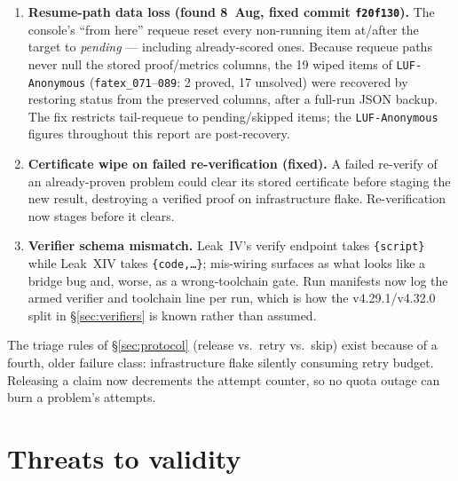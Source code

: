 \documentclass[12pt, a4paper]{article}
\newcommand{\run}[1]{\texttt{#1}}
\begin{document}
\begin{enumerate}[itemsep=2pt]
\item \textbf{Resume-path data loss (found 8~Aug, fixed commit
      \run{f20f130}).} The console's ``from here'' requeue reset every
      non-running item at/after the target to \emph{pending} --- including
      already-scored ones. Because requeue paths never null the stored
      proof/metrics columns, the 19 wiped items of \run{LUF-Anonymous}
      (\run{fatex\_071}--\run{089}: 2 proved, 17 unsolved) were recovered by
      restoring status from the preserved columns, after a full-run JSON
      backup. The fix restricts tail-requeue to pending/skipped items; the
      \run{LUF-Anonymous} figures throughout this report are post-recovery.
\item \textbf{Certificate wipe on failed re-verification (fixed).} A failed
      re-verify of an already-proven problem could clear its stored
      certificate before staging the new result, destroying a verified proof
      on infrastructure flake. Re-verification now stages before it clears.
\item \textbf{Verifier schema mismatch.} Leak~IV's verify endpoint takes
      \run{\{script\}} while Leak~XIV takes \run{\{code,\dots\}}; mis-wiring
      surfaces as what looks like a bridge bug and, worse, as a
      wrong-toolchain gate. Run manifests now log the armed verifier and
      toolchain line per run, which is how the v4.29.1/v4.32.0 split in
      \S\ref{sec:verifiers} is known rather than assumed.
\end{enumerate}

The triage rules of \S\ref{sec:protocol} (release vs.\ retry vs.\ skip) exist
because of a fourth, older failure class: infrastructure flake silently
consuming retry budget. Releasing a claim now decrements the attempt counter,
so no quota outage can burn a problem's attempts.

\section{Threats to validity}
\label{sec:validity}
\end{document}
